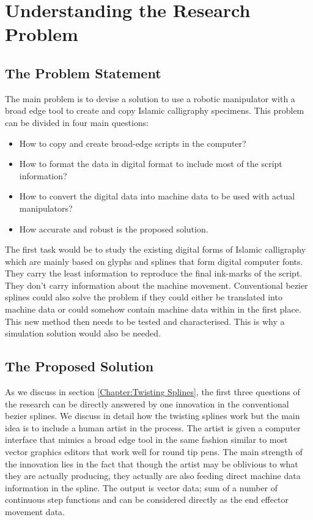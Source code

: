 \section{Understanding the Research Problem}
\label{Chapter:Problem Statement}
{
    \subsection{The Problem Statement}
    {
        The main problem is to devise a solution to use a robotic manipulator with a broad edge tool to create and copy Islamic calligraphy specimens. This problem can be divided in four main questions:
        \begin{itemize}
          \item How to copy and create broad-edge scripts in the computer?
          \item How to format the data in digital format to include most of the script information?
          \item How to convert the digital data into machine data to be used with actual manipulators?
          \item How accurate and robust is the proposed solution.
        \end{itemize}

        The first task would be to study the existing digital forms of Islamic calligraphy which are mainly based on glyphs and splines that form digital computer fonts. They carry the least information to reproduce the final ink-marks of the script. They don’t carry information about the machine movement. Conventional bezier splines could also solve the problem if they could either be translated into machine data or could somehow contain machine data within in the first place. This new method then needs to be tested and characterised. This is why a simulation solution would also be needed.

    }
    \subsection{The Proposed Solution}
    {
        As we discuss in section \ref{Chapter:Twisting Splines}, the first three questions of the research can be directly answered by one innovation in the conventional bezier splines. We discuss in detail how the twisting splines work but the main idea is to include a human artist in the process. The artist is given a computer interface that mimics a broad edge tool in the same fashion similar to most vector graphics editors that work well for round tip pens. The main strength of the innovation lies in the fact that though the artist may be oblivious to what they are actually producing, they actually are also feeding direct machine data information in the spline. The output is vector data; sum of a number of continuous step functions and can be considered directly as the end effector movement data.

}}
